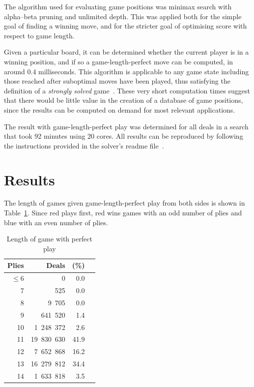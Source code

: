 \documentclass[a4paper, twocolumn]{article}
\begin{document}
The algorithm used for evaluating game positions was minimax search with
alpha--beta pruning and unlimited depth. This was applied both for the simple
goal of finding a winning move, and for the stricter goal of optimising score
with respect to game length.

Given a particular board, it can be determined whether the current player is in
a winning position, and if so a game-length-perfect move can be computed, in around
0.4 milliseconds. This algorithm is applicable to any game state including those
reached after suboptimal moves have been played, thus satisfying the definition
of a \textit{strongly solved} game~\cite{games-solved}. These very short
computation times suggest that there would be little value in the creation of a
database of game positions, since the results can be computed on demand for most
relevant applications.

The result with game-length-perfect play was determined for all deals in a
search that took 92 minutes using 20 cores. All results can be
reproduced by following the instructions provided in the solver's readme
file~\cite{github}.


\section{Results}

The length of games given game-length-perfect play from both sides is shown in
Table~\ref{tab:game-length}. Since red plays first, red wins games with an odd
number of plies and blue with an even number of plies.

\begin{table}[ht]
  \centering
  \begin{tabular}{r r r c}
    \toprule
    \textbf{Plies} & \textbf{Deals} & \textbf{(\%)} \\
    \midrule
    $\leq 6$ & 0 & 0.0 \\
    7 & 525 & 0.0 \\
    8 & 9~705 & 0.0 \\
    9 & 641~520 & 1.4 \\
    10 & 1~248~372 & 2.6 \\
    11 & 19~830~630 & 41.9 \\
    12 & 7~652~868 & 16.2 \\
    13 & 16~279~812 & 34.4 \\
    14 & 1~633~818 & 3.5 \\
    \bottomrule
  \end{tabular}
  \caption{Length of game with perfect play}
  \label{tab:game-length}
\end{table}
\end{document}
